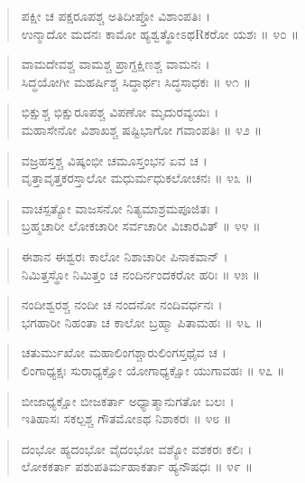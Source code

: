 \begin{verse}
ಪಕ್ಷೀ ಚ ಪಕ್ಷರೂಪಶ್ಚ ಅತಿದೀಪ್ತೋ ವಿಶಾಂಪತಿಃ ।\\ಉನ್ಮಾದೋ ಮದನಃ ಕಾಮೋ ಹ್ಯಶ್ವತ್ಥೋಽಥRಕರೋ ಯಶಃ \num{॥ ೪೦ ॥}
\end{verse}

\begin{verse}
ವಾಮದೇವಶ್ಚ ವಾಮಶ್ಚ ಪ್ರಾಗ್ದಕ್ಷಿಣಶ್ಚ ವಾಮನಃ ।\\ಸಿದ್ಧಯೋಗೀ ಮಹರ್ಷಿಶ್ಚ ಸಿದ್ಧಾರ್ಥಃ ಸಿದ್ಧಸಾಧಕಃ \num{॥ ೪೧ ॥}
\end{verse}

\begin{verse}
ಭಿಕ್ಷುಶ್ಚ ಭಿಕ್ಷುರೂಪಶ್ಚ ವಿಪಣೋ ಮೃದುರವ್ಯಯಃ ।\\ಮಹಾಸೇನೋ ವಿಶಾಖಶ್ಚ ಷಷ್ಟಿಭಾಗೋ ಗವಾಂಪತಿಃ \num{॥ ೪೨ ॥}
\end{verse}

\begin{verse}
ವಜ್ರಹಸ್ತಶ್ಚ ವಿಷ್ಕಂಭೀ ಚಮೂಸ್ತಂಭನ ಏವ ಚ ।\\ವೃತ್ತಾವೃತ್ತಕರಸ್ತಾಲೋ ಮಧುರ್ಮಧುಕಲೋಚನಃ \num{॥ ೪೩ ॥}
\end{verse}

\begin{verse}
ವಾಚಸ್ಪತ್ಯೋ ವಾಜಸನೋ ನಿತ್ಯಮಾಶ್ರಮಪೂಜಿತಃ ।\\ಬ್ರಹ್ಮಚಾರೀ ಲೋಕಚಾರೀ ಸರ್ವಚಾರೀ ವಿಚಾರವಿತ್ \num{॥ ೪೪ ॥}
\end{verse}

\begin{verse}
ಈಶಾನ ಈಶ್ವರಃ ಕಾಲೋ ನಿಶಾಚಾರೀ ಪಿನಾಕವಾನ್ ।\\ನಿಮಿತ್ತಸ್ಥೋ ನಿಮಿತ್ತಂ ಚ ನಂದಿರ್ನಂದಕರೋ ಹರಿಃ \num{॥ ೪೫ ॥}
\end{verse}

\begin{verse}
ನಂದೀಶ್ವರಶ್ಚ ನಂದೀ ಚ ನಂದನೋ ನಂದಿವರ್ಧನಃ ।\\ಭಗಹಾರೀ ನಿಹಂತಾ ಚ ಕಾಲೋ ಬ್ರಹ್ಮಾ ಪಿತಾಮಹಃ \num{॥ ೪೬ ॥}
\end{verse}

\begin{verse}
ಚತುರ್ಮುಖೋ ಮಹಾಲಿಂಗಶ್ಚಾರುಲಿಂಗಸ್ತಥೈವ ಚ ।\\ಲಿಂಗಾಧ್ಯಕ್ಷಃ ಸುರಾಧ್ಯಕ್ಷೋ ಯೋಗಾಧ್ಯಕ್ಷೋ ಯುಗಾವಹಃ \num{॥ ೪೭ ॥}
\end{verse}

\begin{verse}
ಬೀಜಾಧ್ಯಕ್ಷೋ ಬೀಜಕರ್ತಾ ಅಧ್ಯಾತ್ಮಾನುಗತೋ ಬಲಃ ।\\ಇತಿಹಾಸಃ ಸಕಲ್ಪಶ್ಚ ಗೌತಮೋಽಥ ನಿಶಾಕರಃ \num{॥ ೪೮ ॥}
\end{verse}

\begin{verse}
ದಂಭೋ ಹ್ಯದಂಭೋ ವೈದಂಭೋ ವಶ್ಯೋ ವಶಕರಃ ಕಲಿಃ ।\\ಲೋಕಕರ್ತಾ ಪಶುಪತಿರ್ಮಹಾಕರ್ತಾ ಹ್ಯನೌಷಧಃ \num{॥ ೪೯ ॥}
\end{verse}

